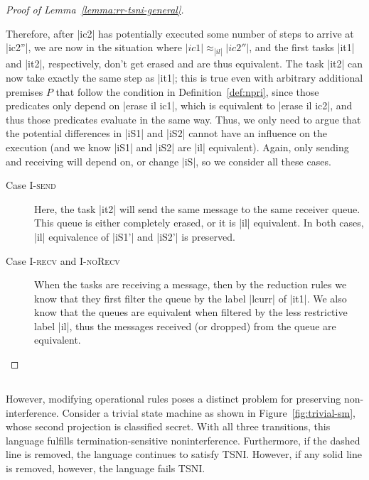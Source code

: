 \begin{proof}[Proof of Lemma~\ref{lemma:rr-tsni-general}]
\begin{itemize}
    
    Therefore, after |ic2| has potentially executed some number of steps
    to arrive at |ic2''|, we are now in the situation where $|ic1|\approx_{|il|}|ic2''|$, and the first tasks |it1| and |it2|,
    respectively, don't get erased and are thus equivalent.
    The task |it2| can now take exactly the same step as |it1|;  this
    is true even with arbitrary additional premises $P$ that follow
    the condition in Definition~\ref{def:npri}, since those
    predicates only depend on |erase il ic1|, which is equivalent
    to |erase il ic2|, and thus those predicates evaluate in the same way.
    Thus, we only
    need to argue that the potential differences in |iS1| and |iS2| cannot
    have an influence on the execution (and we know |iS1| and |iS2| are
    |il| equivalent).
    Again, only sending and receiving will depend on, or change |iS|,
    so we consider all these cases.
    \begin{description}
      \item[Case \textsc{I-send}]
      Here, the task |it2| will send the same message to the same
      receiver queue. This
      queue is either completely erased, or it is |il| equivalent.  In both
      cases, |il| equivalence of |iS1'| and |iS2'| is preserved.
      \item[Case \textsc{I-recv} and \textsc{I-noRecv}]
      When the tasks are receiving a message, then by the reduction rules
      we know that they first filter the queue by the label
      |lcurr| of |it1|.  We
      also know that the queues are equivalent when filtered by the less
      restrictive label |il|, thus the messages received (or dropped) from the
      queue are equivalent.
    \end{description}
  \end{itemize}
\end{proof}


\subsection{}

However, modifying operational rules poses a distinct problem for
preserving non-interference.  Consider a trivial state machine as shown
in Figure~\ref{fig:trivial-sm}, whose second projection is classified
secret.  With all three transitions, this language fulfills
termination-sensitive noninterference.  Furthermore, if the dashed line
is removed, the language continues to satisfy TSNI.  However, if any
solid line is removed, however, the language fails TSNI.

